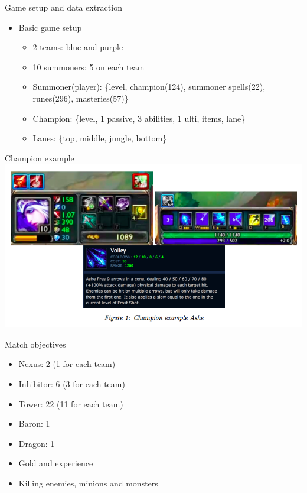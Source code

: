 \begin{frame}{Game setup and data extraction}
\begin{itemize}
\item Basic game setup
\begin{itemize}
\item 2 teams: blue and purple
\item 10 summoners: 5 on each team
\item Summoner(player): \{level, champion(124), summoner spells(22), runes(296), masteries(57)\}
\item Champion: \{level, 1 passive, 3 abilities, 1 ulti, items, lane\}
\item Lanes: \{top, middle, jungle, bottom\}
\end{itemize}
\end{itemize}
\end{frame}
\begin{frame}{Champion example}
\includegraphics[scale=0.4]{leagueoflegends/ashe}
\end{frame}
\begin{frame}{Match objectives}
\begin{itemize}
\item Nexus: 2 (1 for each team)
\item Inhibitor: 6 (3 for each team)
\item Tower: 22 (11 for each team)
\item Baron: 1
\item Dragon: 1 
\item Gold and experience
\item Killing enemies, minions and monsters
\end{itemize}
\end{frame}
